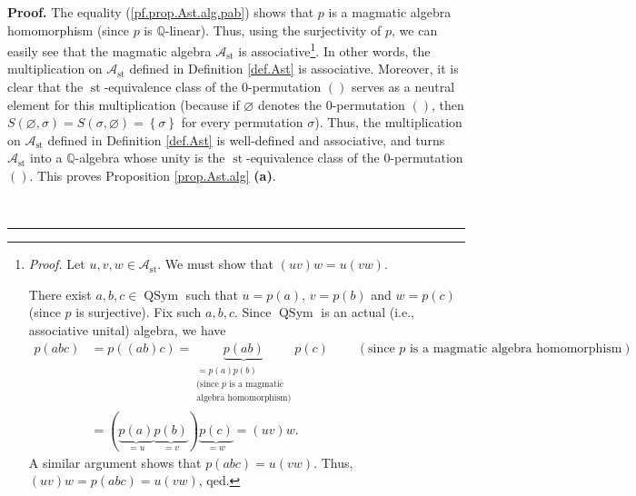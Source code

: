 \documentclass[numbers=enddot,12pt,final,onecolumn,notitlepage]{scrartcl}%
\theoremstyle{definition}
\newenvironment{proof}[1][Proof]{\noindent\textbf{#1.} }{\ \rule{0.5em}{0.5em}}
\newenvironment{verlong}{}{}
\begin{document}
\begin{verlong}
\begin{proof}
The equality (\ref{pf.prop.Ast.alg.pab}) shows that $p$ is a magmatic algebra
homomorphism (since $p$ is $\mathbb{Q}$-linear). Thus, using the surjectivity
of $p$, we can easily see that the magmatic algebra $\mathcal{A}%
_{\operatorname{st}}$ is associative\footnote{\textit{Proof.} Let
$u,v,w\in\mathcal{A}_{\operatorname{st}}$. We must show that $\left(
uv\right)  w=u\left(  vw\right)  $.
\par
There exist $a,b,c\in\operatorname*{QSym}$ such that $u=p\left(  a\right)  $,
$v=p\left(  b\right)  $ and $w=p\left(  c\right)  $ (since $p$ is surjective).
Fix such $a,b,c$. Since $\operatorname*{QSym}$ is an actual (i.e., associative
unital) algebra, we have%
\begin{align*}
p\left(  abc\right)   &  =p\left(  \left(  ab\right)  c\right)
=\underbrace{p\left(  ab\right)  }_{\substack{=p\left(  a\right)  p\left(
b\right)  \\\text{(since }p\text{ is a magmatic}\\\text{algebra homomorphism)}%
}}p\left(  c\right)  \ \ \ \ \ \ \ \ \ \ \left(  \text{since }p\text{ is a
magmatic algebra homomorphism}\right) \\
&  =\left(  \underbrace{p\left(  a\right)  }_{=u}\underbrace{p\left(
b\right)  }_{=v}\right)  \underbrace{p\left(  c\right)  }_{=w}=\left(
uv\right)  w.
\end{align*}
A similar argument shows that $p\left(  abc\right)  =u\left(  vw\right)  $.
Thus, $\left(  uv\right)  w=p\left(  abc\right)  =u\left(  vw\right)  $,
qed.}. In other words, the multiplication on $\mathcal{A}_{\operatorname{st}}$
defined in Definition \ref{def.Ast} is associative. Moreover, it is clear
that the $\operatorname{st}$-equivalence class of the $0$-permutation
$\left( \right)$
serves as a neutral element for this multiplication (because if $\varnothing$
denotes the $0$-permutation $\left( \right)$,
then $S\left(  \varnothing,\sigma\right)
=S\left(  \sigma,\varnothing\right)  =\left\{  \sigma\right\}  $ for every
permutation $\sigma$). Thus, the multiplication on $\mathcal{A}%
_{\operatorname{st}}$ defined in Definition \ref{def.Ast} is well-defined and
associative, and turns $\mathcal{A}_{\operatorname{st}}$ into a $\mathbb{Q}%
$-algebra whose unity is the $\operatorname{st}$-equivalence class of the
$0$-permutation $\left( \right)$.
This proves Proposition \ref{prop.Ast.alg} \textbf{(a)}.


\end{proof}
\end{verlong}
\end{document}
